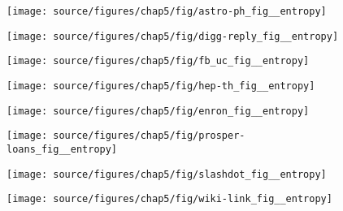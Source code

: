 
\begin{subfigure}
     \centering
         \texttt{[image: source/figures/chap5/fig/astro-ph\_fig\_\_entropy]}
\end{subfigure}
\begin{subfigure}
         \centering
      \texttt{[image: source/figures/chap5/fig/digg-reply\_fig\_\_entropy]}               
\end{subfigure}                                                                          
\begin{subfigure}                                                                        
         \centering                                                                      
      \texttt{[image: source/figures/chap5/fig/fb\_uc\_fig\_\_entropy]}
\end{subfigure}                                                                          
\begin{subfigure}                                                                        
         \centering                                                                      
      \texttt{[image: source/figures/chap5/fig/hep-th\_fig\_\_entropy]}
\end{subfigure}                                                                          
\begin{subfigure}                                                                        
     \centering                                                                          
         \texttt{[image: source/figures/chap5/fig/enron\_fig\_\_entropy]}
\end{subfigure}
\begin{subfigure}
         \centering
      \texttt{[image: source/figures/chap5/fig/prosper-loans\_fig\_\_entropy]}
\end{subfigure}                                                             
\begin{subfigure}                                                           
         \centering                                                         
      \texttt{[image: source/figures/chap5/fig/slashdot\_fig\_\_entropy]}
\end{subfigure}                                                             
\begin{subfigure}                                                           
         \centering                                                         
      \texttt{[image: source/figures/chap5/fig/wiki-link\_fig\_\_entropy]}
\end{subfigure}                                                             
